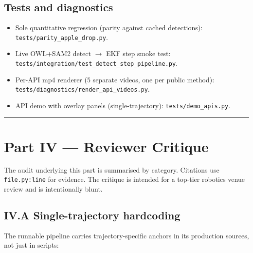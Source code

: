 \documentclass[11pt]{article}
\newcommand{\file}[1]{\texttt{#1}}
\begin{document}
\subsection*{Tests and diagnostics}
\begin{itemize}[leftmargin=1.5em,itemsep=0pt,topsep=2pt]
\item Sole quantitative regression (parity against cached detections): \file{tests/parity\_apple\_drop.py}.
\item Live OWL+SAM2 detect $\to$ EKF step smoke test: \file{tests/integration/test\_detect\_step\_pipeline.py}.
\item Per-API mp4 renderer (5 separate videos, one per public method): \file{tests/diagnostics/render\_api\_videos.py}.
\item API demo with overlay panels (single-trajectory): \file{tests/demo\_apis.py}.
\end{itemize}

\fussy

\bigskip\hrule\bigskip

\section*{Part IV --- Reviewer Critique}
\label{sec:critique}

The audit underlying this part is summarised by category. Citations use
\texttt{file.py:line} for evidence. The critique is intended for a top-tier
robotics venue review and is intentionally blunt.

\subsection*{IV.A Single-trajectory hardcoding}

The runnable pipeline carries trajectory-specific anchors in its production
sources, not just in scripts:
\end{document}
